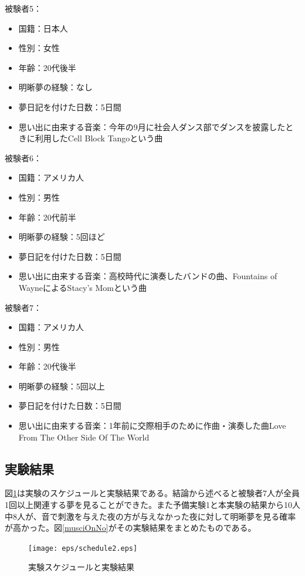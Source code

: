 被験者5：
\begin{itemize}
\item 国籍：日本人
\item 性別：女性
\item 年齢：20代後半
\item 明晰夢の経験：なし
\item 夢日記を付けた日数：5日間
\item 思い出に由来する音楽：今年の9月に社会人ダンス部でダンスを披露したときに利用したCell Block Tangoという曲
\end{itemize}

被験者6：
\begin{itemize}
\item 国籍：アメリカ人
\item 性別：男性
\item 年齢：20代前半
\item 明晰夢の経験：5回ほど
\item 夢日記を付けた日数：5日間
\item 思い出に由来する音楽：高校時代に演奏したバンドの曲、Fountains of WayneによるStacy's Momという曲
\end{itemize}

被験者7：
\begin{itemize}
\item 国籍：アメリカ人
\item 性別：男性
\item 年齢：20代後半
\item 明晰夢の経験：5回以上
\item 夢日記を付けた日数：5日間
\item 思い出に由来する音楽：1年前に交際相手のために作曲・演奏した曲Love From The Other Side Of The World\end{itemize}

\subsection{実験結果}
図\ref{experiment3}は実験のスケジュールと実験結果である。結論から述べると被験者7人が全員1回以上関連する夢を見ることができた。また予備実験1と本実験の結果から10人中8人が、音で刺激を与えた夜の方が与えなかった夜に対して明晰夢を見る確率が高かった。図\ref{musciOnNo}がその実験結果をまとめたものである。

\begin{figure}[htbp]
\begin{center}
\texttt{[image: eps/schedule2.eps]}
\caption{実験スケジュールと実験結果}
\label{experiment3}
\end{center}
\end{figure}

